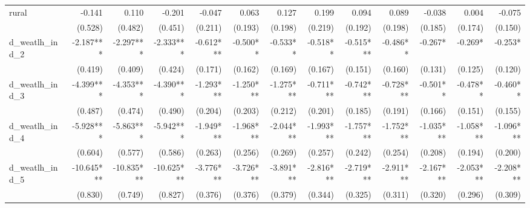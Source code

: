 \begin{tabular}{lrrrrrrrrrrrr}
rural                                       &       -0.141 &        0.110 &       -0.201 &       -0.047 &        0.063 &        0.127 &        0.199 &        0.094 &        0.089 &       -0.038 &        0.004 &       -0.075 \\ 
                                            &      (0.528) &      (0.482) &      (0.451) &      (0.211) &      (0.193) &      (0.198) &      (0.219) &      (0.192) &      (0.198) &      (0.185) &      (0.174) &      (0.150) \\ 
d\_weatlh\_ind\_2                           &    -2.187*** &    -2.297*** &    -2.333*** &    -0.612*** &     -0.500** &     -0.533** &     -0.518** &    -0.515*** &     -0.486** &      -0.267* &      -0.269* &      -0.253* \\ 
                                            &      (0.419) &      (0.409) &      (0.424) &      (0.171) &      (0.162) &      (0.169) &      (0.167) &      (0.151) &      (0.160) &      (0.131) &      (0.125) &      (0.120) \\ 
d\_weatlh\_ind\_3                           &    -4.399*** &    -4.353*** &    -4.390*** &    -1.293*** &    -1.250*** &    -1.275*** &    -0.711*** &    -0.742*** &    -0.728*** &     -0.501** &     -0.478** &     -0.460** \\ 
                                            &      (0.487) &      (0.474) &      (0.490) &      (0.204) &      (0.203) &      (0.212) &      (0.201) &      (0.185) &      (0.191) &      (0.166) &      (0.151) &      (0.155) \\ 
d\_weatlh\_ind\_4                           &    -5.928*** &    -5.863*** &    -5.942*** &    -1.949*** &    -1.968*** &    -2.044*** &    -1.993*** &    -1.757*** &    -1.752*** &    -1.035*** &    -1.058*** &    -1.096*** \\ 
                                            &      (0.604) &      (0.577) &      (0.586) &      (0.263) &      (0.256) &      (0.269) &      (0.257) &      (0.242) &      (0.254) &      (0.208) &      (0.194) &      (0.200) \\ 
d\_weatlh\_ind\_5                           &   -10.645*** &   -10.835*** &   -10.625*** &    -3.776*** &    -3.726*** &    -3.891*** &    -2.816*** &    -2.719*** &    -2.911*** &    -2.167*** &    -2.053*** &    -2.208*** \\ 
                                            &      (0.830) &      (0.749) &      (0.827) &      (0.376) &      (0.376) &      (0.379) &      (0.344) &      (0.325) &      (0.311) &      (0.320) &      (0.296) &      (0.309) \\ 

\end{tabular}
